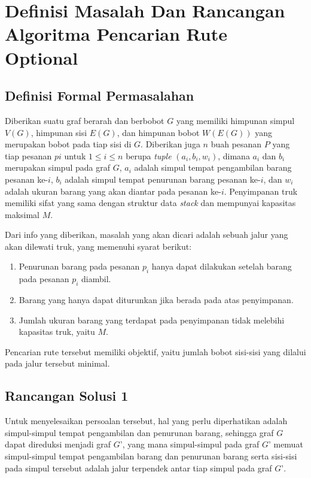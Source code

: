 \chapter{Definisi Masalah Dan Rancangan Algoritma Pencarian Rute Optional}

\section{Definisi Formal Permasalahan}

Diberikan suatu graf berarah dan berbobot $G$ yang memiliki himpunan simpul $V(G)$, himpunan sisi $E(G)$, dan himpunan bobot $W(E(G))$ yang merupakan 
bobot pada tiap sisi di $G$. Diberikan juga $n$ buah pesanan $P$ yang tiap pesanan $pi$ untuk $1 \leq i \leq n$ berupa \textit{tuple} $(a_{i}, b_{i}, w_{i})$, 
dimana $a_{i}$ dan $b_{i}$ merupakan simpul pada graf $G$, $a_{i}$ adalah simpul tempat pengambilan barang pesanan ke-$i$, $b_{i}$ adalah simpul tempat penurunan 
barang pesanan ke-$i$, dan $w_{i}$ adalah ukuran barang yang akan diantar pada pesanan ke-$i$. Penyimpanan truk memiliki sifat yang sama dengan struktur data \textit{stack} 
dan mempunyai kapasitas maksimal $M$.

Dari info yang diberikan, masalah yang akan dicari adalah sebuah jalur yang akan dilewati truk, yang memenuhi syarat berikut:
\begin{enumerate}
    \item Penurunan barang pada pesanan $p_{i}$ hanya dapat dilakukan setelah barang pada pesanan $p_{i}$ diambil.
    \item Barang yang hanya dapat diturunkan jika berada pada atas penyimpanan.
    \item Jumlah ukuran barang yang terdapat pada penyimpanan tidak melebihi kapasitas truk, yaitu $M$.
\end{enumerate}

Pencarian rute tersebut memiliki objektif, yaitu jumlah bobot sisi-sisi yang dilalui pada jalur tersebut minimal.

\section{Rancangan Solusi 1}

Untuk menyelesaikan persoalan tersebut, hal yang perlu diperhatikan adalah simpul-simpul tempat pengambilan dan penurunan barang, sehingga graf $G$ 
dapat direduksi menjadi graf $G’$, yang mana simpul-simpul pada graf $G’$ memuat simpul-simpul tempat pengambilan barang dan penurunan barang serta 
sisi-sisi pada simpul tersebut adalah jalur terpendek antar tiap simpul pada graf $G’$.

